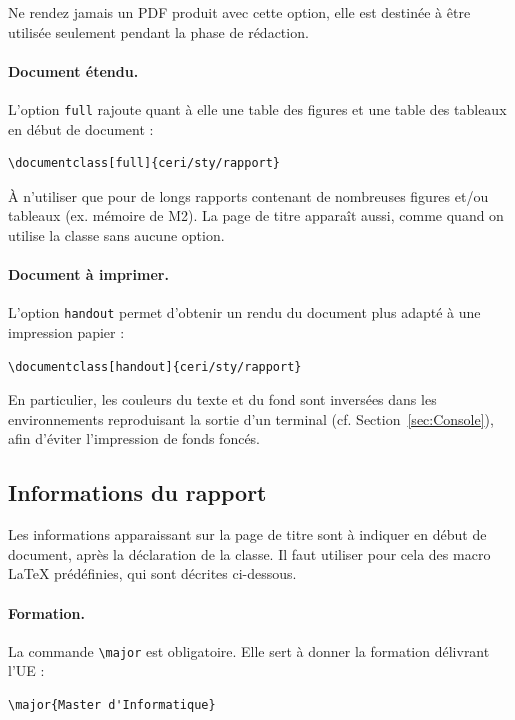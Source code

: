 \documentclass{ceri/sty/rapport}
\begin{document}
\begin{beware}[Remarque]
Ne rendez jamais un PDF produit avec cette option, elle est destinée à être utilisée seulement pendant la phase de rédaction.
\end{beware}

\paragraph{Document étendu.} L'option \texttt{full} rajoute quant à elle une table des figures et une table des tableaux en début de document :
\begin{lstlisting}[language={[LaTeX]TeX}, numbers=none]
\documentclass[full]{ceri/sty/rapport}
\end{lstlisting}
À n'utiliser que pour de longs rapports contenant de nombreuses figures et/ou tableaux (ex. mémoire de M2). La page de titre apparaît aussi, comme quand on utilise la classe sans aucune option.

\paragraph{Document à imprimer.} L'option \texttt{handout} permet d'obtenir un rendu du document plus adapté à une impression papier : 
\begin{lstlisting}[language={[LaTeX]TeX}, numbers=none]
\documentclass[handout]{ceri/sty/rapport}
\end{lstlisting}
En particulier, les couleurs du texte et du fond sont inversées dans les environnements reproduisant la sortie d'un terminal (cf. Section~\ref{sec:Console}), afin d'éviter l'impression de fonds foncés.


\subsection{Informations du rapport}
\label{sec:InfoRapport}
Les informations apparaissant sur la page de titre sont à indiquer en début de document, après la déclaration de la classe. Il faut utiliser pour cela des macro \LaTeX{} prédéfinies, qui sont décrites ci-dessous.

\paragraph{Formation.} La commande \texttt{\textbackslash{}major} est obligatoire. Elle sert à donner la formation délivrant l'UE :
\begin{lstlisting}[language={[LaTeX]TeX}, numbers=none]
\major{Master d'Informatique}
\end{lstlisting}
\end{document}
